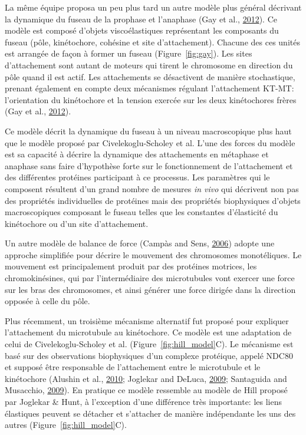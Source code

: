 \documentclass[12pt,a4paper,twoside,openright]{book}
\begin{document}
La même équipe proposa un peu plus tard un autre modèle plus général
décrivant la dynamique du fuseau de la prophase et l'anaphase (Gay et
al., \protect\hyperlink{ref-Gay2012a}{2012}). Ce modèle est composé
d'objets viscoélastiques représentant les composants du fuseau (pôle,
kinétochore, cohésine et site d'attachement). Chacune des ces unités est
arrangée de façon à former un fuseau (Figure~\ref{fig:gay}). Les sites
d'attachement sont autant de moteurs qui tirent le chromosome en
direction du pôle quand il est actif. Les attachements se désactivent de
manière stochastique, prenant également en compte deux mécanismes
régulant l'attachement KT-MT: l'orientation du kinétochore et la tension
exercée sur les deux kinétochores frères (Gay et al.,
\protect\hyperlink{ref-Gay2012a}{2012}).

Ce modèle décrit la dynamique du fuseau à un niveau macroscopique plus
haut que le modèle proposé par Civelekoglu-Scholey et al. L'une des
forces du modèle est sa capacité à décrire la dynamique des attachements
en métaphase et anaphase sans faire d'hypothèse forte sur le
fonctionnement de l'attachement et des différentes protéines participant
à ce processus. Les paramètres qui le composent résultent d'un grand
nombre de mesures \emph{in vivo} qui décrivent non pas des propriétés
individuelles de protéines mais des propriétés biophysiques d'objets
macroscopiques composant le fuseau telles que les constantes
d'élasticité du kinétochore ou d'un site d'attachement.

Un autre modèle de balance de force (Campàs and Sens,
\protect\hyperlink{ref-Campas2006}{2006}) adopte une approche simplifiée
pour décrire le mouvement des chromosomes monotéliques. Le mouvement est
principalement produit par des protéines motrices, les chromokinésines,
qui par l'intermédiaire des microtubules vont exercer une force sur les
bras des chromosomes, et ainsi générer une force dirigée dans la
direction opposée à celle du pôle.

Plus récemment, un troisième mécanisme alternatif fut proposé pour
expliquer l'attachement du microtubule au kinétochore. Ce modèle est une
adaptation de celui de Civelekoglu-Scholey et al.
(Figure~\ref{fig:hill_model}C). Le mécanisme est basé sur des
observations biophysiques d'un complexe protéique, appelé NDC80 et
supposé être responsable de l'attachement entre le microtubule et le
kinétochore (Alushin et al., \protect\hyperlink{ref-Alushin2010}{2010};
Joglekar and DeLuca, \protect\hyperlink{ref-Joglekar2009}{2009};
Santaguida and Musacchio,
\protect\hyperlink{ref-Santaguida2009a}{2009}). En pratique ce modèle
ressemble au modèle de Hill proposé par Joglekar \& Hunt, à l'exception
d'une différence très importante: les liens élastiques peuvent se
détacher et s'attacher de manière indépendante les uns des autres
(Figure~\ref{fig:hill_model}C).
\end{document}
